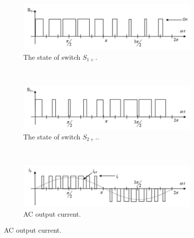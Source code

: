 {\begin{figure}[h!]
                \centering
                \begin{subfigure}[b]{0.9\textwidth}
                    \includegraphics[width=\textwidth]{EMPC_PNG_Pics/CSIwaves_A.png}
                    \caption{\centering The state of switch $S_{1+}$.}
                    \label{BASICCSR:fig:CSIwave_A}
                \end{subfigure}
                ~ %
                \begin{subfigure}[b]{0.9\textwidth}
                    \includegraphics[width=\textwidth]{EMPC_PNG_Pics/CSIwaves_B.png}
                    \caption{\centering The state of switch $S_{2+}$..}
                    \label{BASICCSR:fig:CSIwave_B}
                \end{subfigure}
								 ~ %
                \begin{subfigure}[b]{0.9\textwidth}
                    \includegraphics[width=\textwidth]{EMPC_PNG_Pics/CSIwaves_C.png}
                    \caption{\centering AC output current.}
                    \label{BASICCSR:fig:CSIwave_C}
                \end{subfigure}


\end{figure}}
